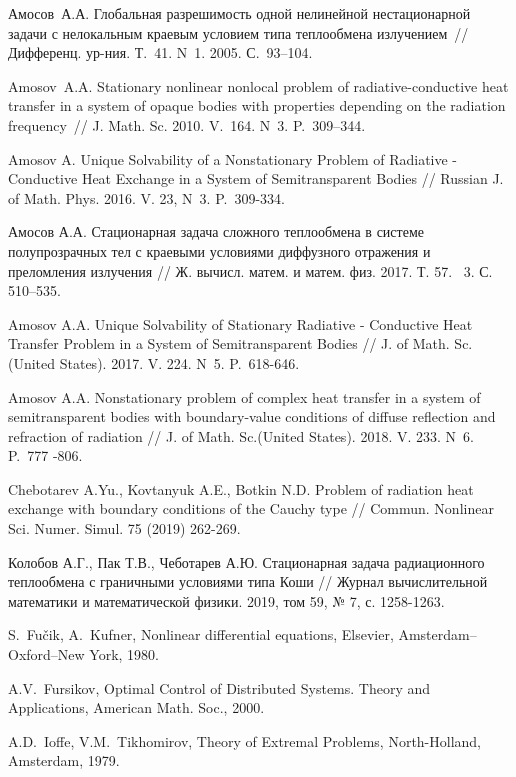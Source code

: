 \documentclass[12pt]{article}
\begin{document}
\begin{thebibliography}{999}
        Амосов~А.А. Глобальная разрешимость одной нелинейной
        нестационарной задачи с нелокальным краевым условием типа
        теплообмена излучением~// Дифференц.
        ур-ния. Т.~41. N~1. 2005. С.~93--104.

        Amosov~A.A. Stationary nonlinear nonlocal problem of
        radiative-conductive heat transfer in a system of opaque bodies
        with properties depending on the radiation frequency~// J.
        Math. Sc. 2010. V.~164. N~3. P.~309--344.

        Amosov A. Unique Solvability of a Nonstationary Problem of Radiative - Conductive
        Heat Exchange in a System of Semitransparent Bodies // Russian J. of Math.
        Phys. 2016. V. 23, N~3. P.~309-334.

        Амосов А.А. Стационарная задача сложного теплообмена в системе полупрозрачных тел с краевыми условиями
        диффузного отражения и преломления излучения // Ж.
        вычисл. матем. и матем. физ. 2017. Т. 57. \textnumero~3. С. 510--535.

        Amosov A.A. Unique Solvability of Stationary Radiative - Conductive Heat Transfer
        Problem in a System of Semitransparent Bodies // J. of Math.
        Sc.(United States). 2017. V. 224. N~5. P.~618-646.

        Amosov A.A. Nonstationary problem of complex heat transfer in a system of
        semitransparent bodies with boundary-value conditions of diffuse reflection and refraction
        of radiation // J. of Math. Sc.(United States). 2018. V. 233. N~6. P.~777 -806.

        Chebotarev A.Yu., Kovtanyuk A.E., Botkin N.D. Problem of radiation heat exchange with boundary conditions
        of the Cauchy type // Commun.
        Nonlinear Sci. Numer. Simul. 75 (2019) 262-269.

        Колобов А.Г., Пак Т.В., Чеботарев А.Ю. Стационарная задача радиационного теплообмена с граничными условиями
        типа Коши // Журнал вычислительной математики и математической физики.
        2019, том 59, № 7, с. 1258-1263.


         S.~Fu\v{c}ik, A.~Kufner, Nonlinear differential equations,
        Elsevier, Amsterdam--Oxford--New York, 1980.

         A.V.~Fursikov, Optimal Control of Distributed
        Systems. Theory and Applications, American Math. Soc., 2000.

         A.D.~Ioffe, V.M.~Tikhomirov, Theory of Extremal
        Problems, North-Holland, Amsterdam, 1979.

    \end{thebibliography}
\end{document}
